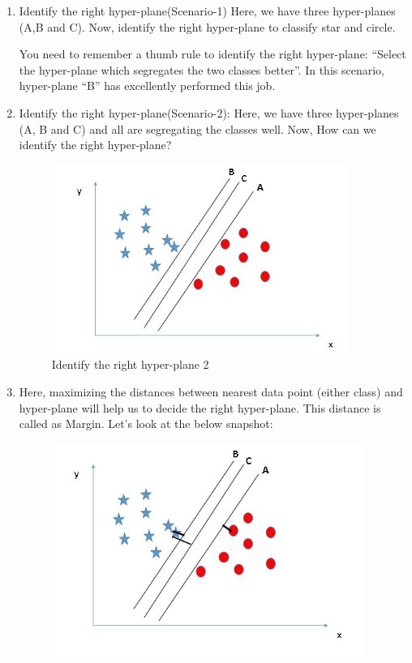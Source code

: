     \begin{enumerate}
        \item Identify the right hyper-plane(Scenario-1)
        Here, we  have three hyper-planes (A,B and C). Now, identify the right hyper-plane to classify star and circle.
            
        You need to remember a thumb rule to identify the right hyper-plane: “Select the hyper-plane which segregates the two classes better”. In this scenario, hyper-plane “B” has excellently performed this job.
        \item Identify the right hyper-plane(Scenario-2): 
        Here, we have three hyper-planes (A, B and C) and all are segregating the classes well. Now, How can we identify the right hyper-plane?
            \begin{figure}[h!]
                \centering
                \includegraphics[scale=0.5]{Figures/svm13.png}
                \caption[Identify the right hyper-plane 2]{Identify the right hyper-plane 2}
                \label{fig:my_label}
            \end{figure}
        \item Here, maximizing the distances between nearest data point (either class) and hyper-plane will help us to decide the right hyper-plane. This distance is called as Margin. Let’s look at the below snapshot:
            \begin{figure}[h!]
                \centering
                \includegraphics[scale=0.5]{Figures/svm14.png}

\end{figure}
\end{enumerate}
